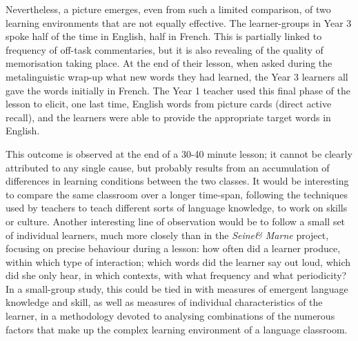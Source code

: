 \documentclass[output=paper,colorlinks,citecolor=brown,modfonts,nonflat]{../langscibook}
\begin{document}
Nevertheless, a picture emerges, even from such a limited comparison, of two learning environments that are not equally effective. The learner-groups in Year 3 spoke half of the time in English, half in French. This is partially linked to frequency of off-task commentaries, but it is also revealing of the quality of memorisation taking place. At the end of their lesson, when asked during the metalinguistic wrap-up what new words they had learned, the Year 3 learners all gave the words initially in French. The Year 1 teacher used this final phase of the lesson to elicit, one last time, English words from picture cards (direct active recall), and the learners were able to provide the appropriate target words in English.

This outcome is observed at the end of a 30-40 minute lesson; it cannot be clearly attributed to any single cause, but probably results from an accumulation of differences in learning conditions between the two classes. It would be interesting to compare the same classroom over a longer time-span, following the techniques used by teachers to teach different sorts of language knowledge, to work on skills or culture. Another interesting line of observation would be to follow a small set of individual learners, much more closely than in the \textit{Seine\& Marne} project, focusing on precise behaviour during a lesson: how often did a learner produce, within which type of interaction; which words did the learner say out loud, which did she only hear, in which contexts, with what frequency and what periodicity? In a small-group study, this could be tied in with measures of emergent language knowledge and skill, as well as measures of individual characteristics of the learner, in a methodology devoted to analysing combinations of the numerous factors that make up the complex learning environment of a language classroom.

{\sloppy\printbibliography[heading=subbibliography,notkeyword=this]}
\end{document}
